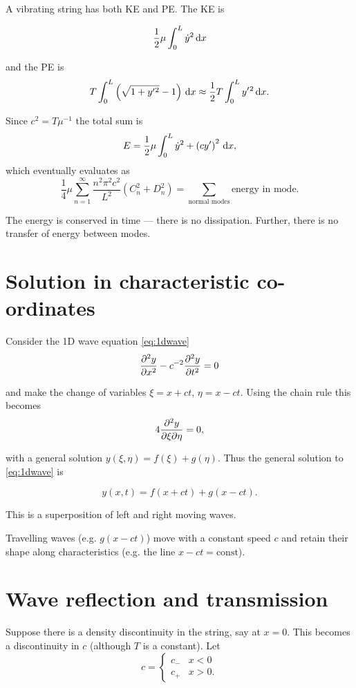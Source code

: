 \documentclass{notes}
\theoremstyle{plain}
\begin{document}
A vibrating string has both KE and PE.  The KE is

\[
\frac{1}{2} \mu \int_0^L \Dot{y}^2\, \mathrm{d} x
\]

and the PE is
\[
T \int_0^L \left(\sqrt{1 + y'{}^2} - 1 \right)\, \mathrm{d} x
\approx \frac{1}{2} T \int_0^L y'{}^2\, \mathrm{d} x.
\]

Since $c^2 = T \mu^{-1}$ the total sum is
\[
E = \frac{1}{2} \mu \int_0^L \Dot{y}^2 + \left( c y' \right)^2\, \mathrm{d} x,
\]
which eventually evaluates as
\[
\frac{1}{4} \mu \sum_{n=1}^\infty \frac{n^2 \pi^2 c^2}{L^2}
\left(C_n^2 + D_n^2\right)
= \sum_{\text{normal modes}} \text{energy in mode.}
\]

The energy is conserved in time --- there is no dissipation.  Further,
there is no transfer of energy between modes.

\section{Solution in characteristic co-ordinates}

Consider the 1D wave equation \eqref{eq:1dwave}
\[
\frac{\partial ^2 y}{\partial x^2} - c^{-2} \frac{\partial ^2 y}{\partial t^2} = 0
\]

and make the change of variables $\xi = x + ct$, $\eta = x - ct$.
Using the chain rule this becomes
\[
4 \frac{\partial ^2 y}{\partial \xi \partial \eta} = 0,
\]

with a general solution $y(\xi,\eta) = f(\xi) + g(\eta)$.  Thus the
general solution to \eqref{eq:1dwave} is

\[
y(x,t) = f(x+ct) + g(x-ct).
\]

This is a superposition of left and right moving waves.

Travelling waves (e.g. $g(x-ct)$) move with a constant speed $c$ and
retain their shape along characteristics (e.g. the line $x-ct = \text{const}$).

\section{Wave reflection and transmission}

Suppose there is a density discontinuity in the string, say at $x=0$.
This becomes a discontinuity in $c$ (although $T$ is a constant).  Let
\[
c = \begin{cases}
c_- & x < 0 \\
c_+ & x > 0.
\end{cases}
\]

\vspace{1.5in}
\end{document}
